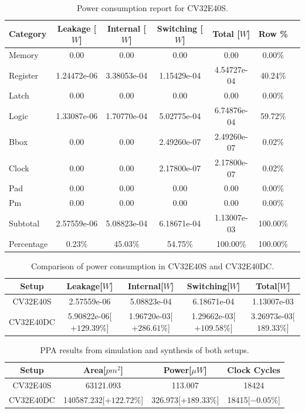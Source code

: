 \begin{table}[h]
\centering
\caption{Power consumption report for CV32E40S.}
\label{tab:cv32e40s_power}
\begin{tabular}{l|cccccc}
\toprule
Category & Leakage [$W$] & Internal [$W$] & Switching [$W$] & Total [$W$] & Row \% \\
\midrule
\rowcolor{black!20} Memory & 0.00 & 0.00 & 0.00 & 0.00 & 0.00\% \\
Register & 1.24472e-06 & 3.38053e-04 & 1.15429e-04 & 4.54727e-04 & 40.24\% \\
\rowcolor{black!20}Latch & 0.00 & 0.00 & 0.00 & 0.00 & 0.00\% \\
Logic & 1.33087e-06 & 1.70770e-04 & 5.02775e-04 & 6.74876e-04 & 59.72\% \\
\rowcolor{black!20}Bbox & 0.00 & 0.00 & 2.49260e-07 & 2.49260e-07 & 0.02\% \\
Clock & 0.00 & 0.00 & 2.17800e-07 & 2.17800e-07 & 0.02\% \\
\rowcolor{black!20}Pad & 0.00 & 0.00 & 0.00 & 0.00 & 0.00\% \\
Pm & 0.00 & 0.00 & 0.00 & 0.00 & 0.00\% \\
\midrule
\rowcolor{black!20} Subtotal & 2.57559e-06 & 5.08823e-04 & 6.18671e-04 & 1.13007e-03 & 100.00\% \\
Percentage & 0.23\% & 45.03\% & 54.75\% & 100.00\% & 100.00\% \\
\bottomrule
\end{tabular}
\end{table}

\begin{table}[h]
\centering
\caption{Comparison of power consumption in CV32E40S and CV32E40DC.}
\label{tab:power_compare}
\begin{tabular}{c|cccc}
\toprule 
Setup & Leakage[$W$] & Internal[$W$] & Switching[$W$] & Total[$W$]\\
\midrule
\rowcolor{black!20} CV32E40S & 2.57559e-06 & 5.08823e-04 & 6.18671e-04 & 1.13007e-03  \\
CV32E40DC & 5.90822e-06[$+129.39\%$] & 1.96720e-03[$+286.61\%$] & 1.29662e-03[$+109.58\%$] & 3.26973e-03[$189.33\%$]\\
\bottomrule
\end{tabular}
\end{table}

\begin{table}[h]
\centering
\caption{PPA results from simulation and synthesis of both setups.}
\label{tab:ppa_results}
\begin{tabular}{c|ccc}
\toprule 
Setup & Area[$pm^2$] & Power[$\mu W$] & Clock Cycles\\
\midrule
\rowcolor{black!20} CV32E40S & 63121.093 & 113.007 & 18424\\
CV32E40DC & 140587.232[$+122.72\%$] & 326.973[$+189.33\%$] & 18415[$-0.05\%$] \\
\bottomrule
\end{tabular}
\end{table}

